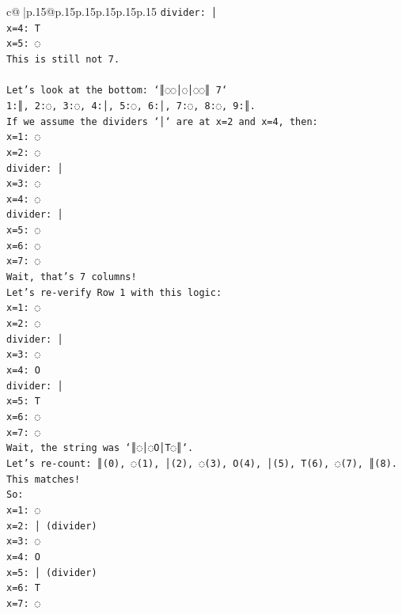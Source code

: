 \documentclass{article}
\begin{document}
{\begin{supertabular}{c@{$\;$}|p{.15\linewidth}@{}p{.15\linewidth}p{.15\linewidth}p{.15\linewidth}p{.15\linewidth}p{.15\linewidth}}
{{{\texttt{divider: │} \\
\texttt{x=4: T} \\
\texttt{x=5: ◌} \\
\texttt{This is still not 7.} \\
\\ 
\texttt{Let's look at the bottom: `║◌◌│◌│◌◌║ 7`} \\
\texttt{1:║, 2:◌, 3:◌, 4:│, 5:◌, 6:│, 7:◌, 8:◌, 9:║.} \\
\texttt{If we assume the dividers `│` are at x=2 and x=4, then:} \\
\texttt{x=1: ◌} \\
\texttt{x=2: ◌} \\
\texttt{divider: │} \\
\texttt{x=3: ◌} \\
\texttt{x=4: ◌} \\
\texttt{divider: │} \\
\texttt{x=5: ◌} \\
\texttt{x=6: ◌} \\
\texttt{x=7: ◌} \\
\texttt{Wait, that's 7 columns!} \\
\texttt{Let's re{-}verify Row 1 with this logic:} \\
\texttt{x=1: ◌} \\
\texttt{x=2: ◌} \\
\texttt{divider: │} \\
\texttt{x=3: ◌} \\
\texttt{x=4: O} \\
\texttt{divider: │} \\
\texttt{x=5: T} \\
\texttt{x=6: ◌} \\
\texttt{x=7: ◌} \\
\texttt{Wait, the string was `║◌│◌O│T◌║`.} \\
\texttt{Let's re{-}count: ║(0), ◌(1), │(2), ◌(3), O(4), │(5), T(6), ◌(7), ║(8).} \\
\texttt{This matches!} \\
\texttt{So:} \\
\texttt{x=1: ◌} \\
\texttt{x=2: │ (divider)} \\
\texttt{x=3: ◌} \\
\texttt{x=4: O} \\
\texttt{x=5: │ (divider)} \\
\texttt{x=6: T} \\
\texttt{x=7: ◌} \\
}}}
\end{supertabular}}
\end{document}
